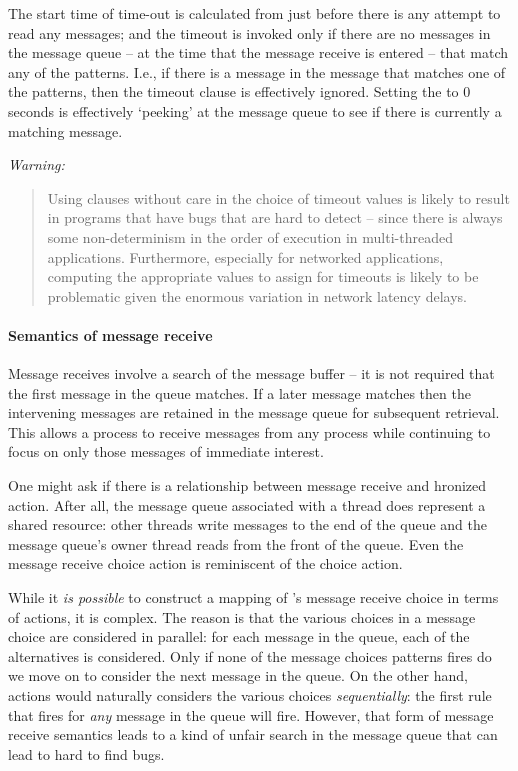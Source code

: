 The start time of time-out is calculated from just before there is any attempt to read any messages; and the timeout is invoked only if there are no messages in the message queue -- at the time that the message receive is entered -- that match any of the patterns. I.e., if there is a message in the message that matches one of the patterns, then the timeout clause is effectively ignored. Setting the  to 0 seconds is effectively `peeking' at the message queue to see if there is currently a matching message.

\emph{Warning:}
\begin{quote}
Using  clauses without care in the choice of timeout values is likely to result in programs that have bugs that are hard to detect -- since there is always some non-determinism in the order of execution in multi-threaded applications. Furthermore, especially for networked applications, computing the appropriate values to assign for timeouts is likely to be problematic given the enormous variation in network latency delays.
\end{quote}

\paragraph{Semantics of message receive}
Message receives involve a search of the message buffer -- it is not required that the first message in the queue matches. If a later message matches then the intervening messages are retained in the message queue for subsequent retrieval. This allows a process to receive messages from any process while continuing to focus on only those messages of immediate interest.

One might ask if there is a relationship between message receive and hronized action. After all, the message queue associated with a thread does represent a shared resource: other threads write messages to the end of the queue and the message queue's owner thread reads from the front of the queue. Even the message receive choice action is reminiscent of the choice  action.

While it \emph{is possible} to construct a mapping of \go's message receive choice in terms of  actions, it is complex. The reason is that the various choices in a message choice are considered in parallel: for each message in the queue, each of the alternatives is considered. Only if none of the message choices patterns fires do we move on to consider the next message in the queue. On the other hand,  actions would naturally considers the various choices \emph{sequentially}: the first rule that fires for \emph{any} message in the queue will fire. However, that form of message receive semantics leads to a kind of unfair search in the message queue that can lead to hard to find bugs.



  
